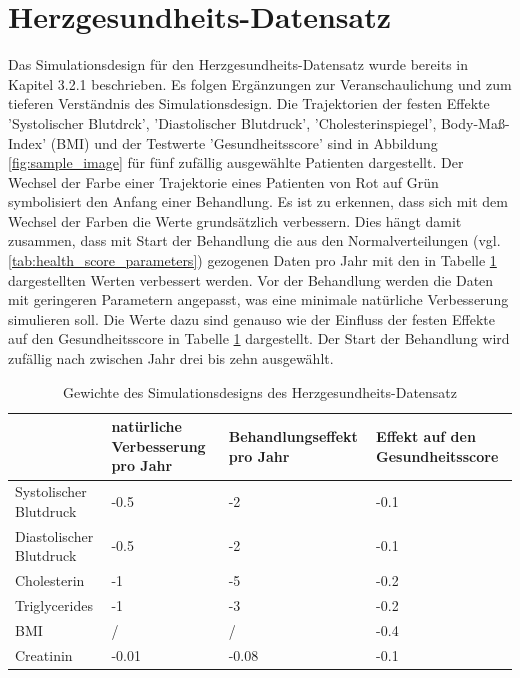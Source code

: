 \documentclass[%
thesis=student,%
coverpage=false,%
titlepage=false,%
headmarks=true, %
german,%
font=libertine, %
math=newpxtx, %
BCOR=5mm,%
coverBCOR=11mm%
]{tumbook}
\theoremstyle{break}
\begin{document}
\section{Herzgesundheits-Datensatz}
Das Simulationsdesign für den Herzgesundheits-Datensatz wurde bereits in Kapitel 3.2.1 beschrieben. Es folgen Ergänzungen zur Veranschaulichung und zum tieferen Verständnis des Simulationsdesign. Die Trajektorien der festen Effekte 'Systolischer Blutdrck', 'Diastolischer Blutdruck', 'Cholesterinspiegel', Body-Maß-Index' (BMI) und der Testwerte 'Gesundheitsscore' sind in Abbildung \ref{fig:sample_image} für fünf zufällig ausgewählte Patienten dargestellt. Der Wechsel der Farbe einer Trajektorie eines Patienten von Rot auf Grün symbolisiert den Anfang einer Behandlung. Es ist zu erkennen, dass sich mit dem Wechsel der Farben die Werte grundsätzlich verbessern. Dies hängt damit zusammen, dass mit Start der Behandlung die aus den Normalverteilungen (vgl. \ref{tab:health_score_parameters}) gezogenen Daten pro Jahr mit den in Tabelle \ref{tab:weights} dargestellten Werten verbessert werden. Vor der Behandlung werden die Daten mit geringeren Parametern angepasst, was eine minimale natürliche Verbesserung simulieren soll. Die Werte dazu sind genauso wie der Einfluss der festen Effekte auf den Gesundheitsscore in Tabelle \ref{tab:weights} dargestellt. Der Start der Behandlung wird zufällig nach zwischen Jahr drei bis zehn ausgewählt.
\begin{table}[H]
	\centering
	\begin{tabular}{|p{3cm}|p{3cm}|p{3cm}|p{3cm}|}
		\hline
		&  natürliche Verbesserung pro Jahr &  Behandlungseffekt pro Jahr &  Effekt auf den Gesundheitsscore \\
		\hline
		Systolischer Blutdruck & -0.5 &  -2 &  -0.1 \\
		\hline
		Diastolischer Blutdruck &  -0.5 &  -2 &  -0.1 \\
		\hline
		Cholesterin &  -1 &  -5 &  -0.2 \\
		\hline
		Triglycerides &  -1 &  -3 &  -0.2 \\
		\hline
		BMI &  / &  / &  -0.4 \\
		\hline
		Creatinin &  -0.01 &  -0.08 &  -0.1 \\
		\hline
	\end{tabular}
	\caption{Gewichte des Simulationsdesigns des Herzgesundheits-Datensatz}
	\label{tab:weights}
\end{table}
\end{document}

